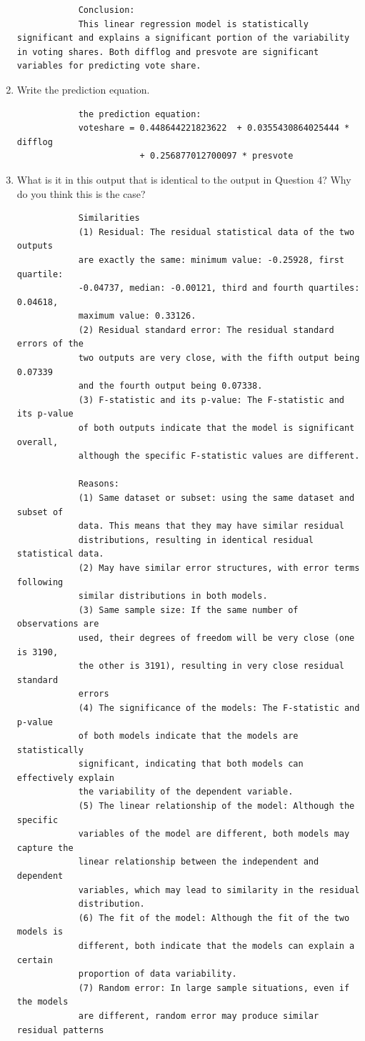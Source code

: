 \documentclass[12pt,letterpaper]{article}
\begin{document}
\begin{enumerate}
\begin{verbatim}
			Conclusion:
			This linear regression model is statistically significant and explains a significant portion of the variability in voting shares. Both difflog and presvote are significant variables for predicting vote share.
		\end{verbatim}
		\vspace{0cm}
		\item Write the prediction equation.	
		
		\begin{verbatim}
			the prediction equation:
			voteshare = 0.448644221823622  + 0.0355430864025444 * difflog  
			            + 0.256877012700097 * presvote
		\end{verbatim}
		\vspace{0cm}
		\item What is it in this output that is identical to the output in Question 4? Why do you think this is the case?
		\begin{verbatim}
			Similarities
			(1) Residual: The residual statistical data of the two outputs 
			are exactly the same: minimum value: -0.25928, first quartile: 
			-0.04737, median: -0.00121, third and fourth quartiles: 0.04618, 
			maximum value: 0.33126.
			(2) Residual standard error: The residual standard errors of the 
			two outputs are very close, with the fifth output being 0.07339 
			and the fourth output being 0.07338.
			(3) F-statistic and its p-value: The F-statistic and its p-value 
			of both outputs indicate that the model is significant overall, 
			although the specific F-statistic values are different.
			
			Reasons:
			(1) Same dataset or subset: using the same dataset and subset of 
			data. This means that they may have similar residual 
			distributions, resulting in identical residual statistical data.
			(2) May have similar error structures, with error terms following 
			similar distributions in both models.
			(3) Same sample size: If the same number of observations are 
			used, their degrees of freedom will be very close (one is 3190, 
			the other is 3191), resulting in very close residual standard 
			errors
			(4) The significance of the models: The F-statistic and p-value 
			of both models indicate that the models are statistically 
			significant, indicating that both models can effectively explain 
			the variability of the dependent variable.
			(5) The linear relationship of the model: Although the specific 
			variables of the model are different, both models may capture the 
			linear relationship between the independent and dependent 
			variables, which may lead to similarity in the residual 
			distribution.
			(6) The fit of the model: Although the fit of the two models is 
			different, both indicate that the models can explain a certain 
			proportion of data variability.
			(7) Random error: In large sample situations, even if the models 
			are different, random error may produce similar residual patterns
		\end{verbatim}
	\end{enumerate}
\end{document}
